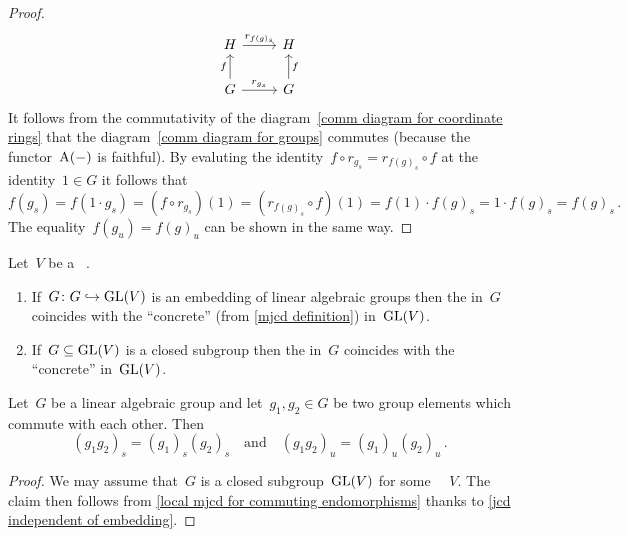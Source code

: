 \begin{proof}
\begin{equation}
\begin{tikzcd}
        H
        \arrow{r}[above]{r_{f(g)_s}}
      & H
      \\
        G
        \arrow{u}[left]{f}
        \arrow{r}[above]{r_{g_s}}
      & G
        \arrow{u}[right]{f}
    \end{tikzcd}
  \end{equation}
  It follows from the commutativity of the diagram~\eqref{comm diagram for coordinate rings} that the diagram~\eqref{comm diagram for groups} commutes (because the functor~$\operatorname{A}(-)$ is faithful).
  By evaluting the identity~$f \circ r_{g_s} = r_{f(g)_s} \circ f$ at the identity~$1 \in G$ it follows that
  \[
      f(g_s)
    = f(1 \cdot g_s)
    = \left( f \circ r_{g_s} \right)(1)
    = \left( r_{f(g)_s} \circ f \right)(1)
    = f(1) \cdot f(g)_s
    = 1 \cdot f(g)_s
    = f(g)_s \,.
  \]
  The equality~$f(g_u) = f(g)_u$ can be shown in the same way.
\end{proof}


\begin{corollary}
  \label{jcd independent of embedding}
  Let~$V$ be a ~.
  \begin{enumerate}
    \item
      If~$G \colon G \hookrightarrow \operatorname{GL}(V)$ is an embedding of linear algebraic groups then the {\JCD} in~$G$ coincides with the \enquote{concrete} {\JCD} (from \cref{mjcd definition}) in~$\operatorname{GL}(V)$.
    \item
      If~$G \subseteq \operatorname{GL}(V)$ is a closed subgroup then the {\JCD} in~$G$ coincides with the \enquote{concrete} {\JCD} in~$\operatorname{GL}(V)$.
    \qedhere
  \end{enumerate}
\end{corollary}


\begin{lemma}
  Let~$G$ be a linear algebraic group and let~$g_1, g_2 \in G$ be two group elements which commute with each other.
  Then
  \[
      (g_1 g_2)_s
    = (g_1)_s (g_2)_s
    \quad\text{and}\quad
      (g_1 g_2)_u
    = (g_1)_u (g_2)_u \,.
  \]
\end{lemma}


\begin{proof}
  We may assume that~$G$ is a closed subgroup~$\operatorname{GL}(V)$ for some ~~$V$.
  The claim then follows from \cref{local mjcd for commuting endomorphisms} thanks to \cref{jcd independent of embedding}.
\end{proof}





